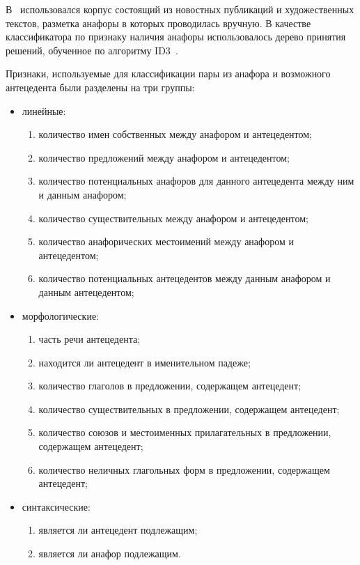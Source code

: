 В~\cite{protopopova2014experience} использовался корпус состоящий из новостных публикаций и художественных текстов, разметка анафоры в которых проводилась вручную. В качестве классификатора по признаку наличия анафоры использовалось дерево принятия решений, обученное по алгоритму ID3~\cite{Quinlan1986InductionOD}.

Признаки, используемые для классификации пары из анафора и возможного антецедента были разделены на три группы:
\begin{itemize}
	\item линейные:
	\begin{enumerate}
		\item количество имен собственных между анафором и антецедентом;
		\item количество предложений между анафором и антецедентом;
		\item количество потенциальных анафоров для данного антецедента между ним и данным анафором;
		\item количество существительных между анафором и антецедентом;
		\item количество анафорических местоимений между анафором и антецедентом;
		\item количество потенциальных антецедентов между данным анафором и данным антецедентом;
	\end{enumerate}
	\item морфологические:
	\begin{enumerate}
		\item часть речи антецедента;
		\item находится ли антецедент в именительном падеже;
		\item количество глаголов в предложении, содержащем антецедент;
		\item количество существительных в предложении, содержащем антецедент;
		\item количество союзов и местоименных прилагательных в предложении, содержащем антецедент;
		\item количество неличных глагольных форм в предложении, содержащем антецедент;
	\end{enumerate}
	\item синтаксические:
	\begin{enumerate}
		\item является ли антецедент подлежащим;
		\item является ли анафор подлежащим.
	\end{enumerate}
\end{itemize}

